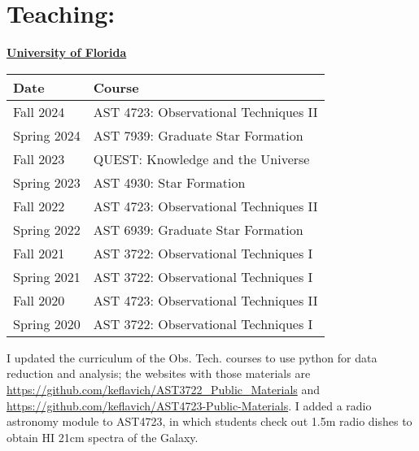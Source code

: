 \begin{minipage}{\textwidth}
\setlength{\extrarowheight}{4pt}
\section*{Teaching: }
\vspace{-6pt}

    \textbf{\underline{University of Florida}}

\begin{tabular}{ll}
    Date         & Course \\%
    \hline
     Fall 2024    &   AST 4723: Observational Techniques II \\
     Spring 2024  &   AST 7939: Graduate Star Formation \\
     Fall 2023    &   QUEST: Knowledge and the Universe \\
     Spring 2023  &   AST 4930: Star Formation \\
     Fall 2022    &   AST 4723: Observational Techniques II \\
     Spring 2022  &   AST 6939: Graduate Star Formation \\
     Fall 2021    &   AST 3722: Observational Techniques I  \\%
     Spring 2021  &   AST 3722: Observational Techniques I  \\%
     Fall 2020    &   AST 4723: Observational Techniques II \\%
     Spring 2020  &   AST 3722: Observational Techniques I  \\%
     \hline
\end{tabular}

I updated the curriculum of the Obs. Tech. courses to use python for data reduction and analysis; 
the websites with those materials are \url{https://github.com/keflavich/AST3722_Public_Materials}
and \url{https://github.com/keflavich/AST4723-Public-Materials}.  I added a radio astronomy module to 
AST4723, in which students check out 1.5m radio dishes to obtain HI 21cm spectra of the Galaxy.


\end{minipage}
